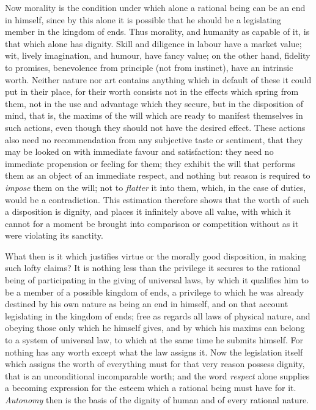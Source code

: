 Now morality is the condition under which alone a rational being can
be an end in himself, since by this alone it is possible that he
should be a legislating member in the kingdom of ends. Thus morality,
and humanity as capable of it, is that which alone has dignity. Skill
and diligence in labour have a market value; wit, lively imagination,
and humour, have fancy value; on the other hand, fidelity to promises,
benevolence from principle (not from instinct), have an intrinsic
worth. Neither nature nor art contains anything which in default of
these it could put in their place, for their worth consists not in the
effects which spring from them, not in the use and advantage which
they secure, but in the disposition of mind, that is, the maxims of
the will which are ready to manifest themselves in such actions, even
though they should not have the desired effect. These actions also
need no recommendation from any subjective taste or sentiment, that
they may be looked on with immediate favour and satisfaction: they
need no immediate propension or feeling for them; they exhibit the
will that performs them as an object of an immediate respect,
 and nothing but reason is required to \textit{impose} them
on the will; not to \textit{flatter} it into them, which, in the case
of duties, would be a contradiction. This estimation therefore shows
that the worth of such a disposition is dignity, and places it
infinitely above all value, with which it cannot for a moment be
brought into comparison or competition without as it were violating
its sanctity.

What then is it which justifies virtue or the morally good
disposition, in making such lofty claims? It is nothing less than the
privilege it secures to the rational being of participating in the
giving of universal laws, by which it qualifies him to be a member of
a possible kingdom of ends, a privilege to which he was already
destined by his own nature as being an end in himself, and on that
account legislating in the kingdom of ends; free as regards all laws
of physical nature, and obeying those only which he himself gives, and
by which his maxims can belong to a system of universal law, to which
at the same time he submits himself. For nothing has any worth except
what the law assigns it. Now the legislation itself which assigns the
worth of everything must for that very reason possess dignity, that is
an unconditional incomparable worth; and the word \textit{respect}
alone supplies a becoming expression for the esteem which a rational
being must have for it. \textit{Autonomy} then is the basis of the
dignity of human and of every rational nature.

